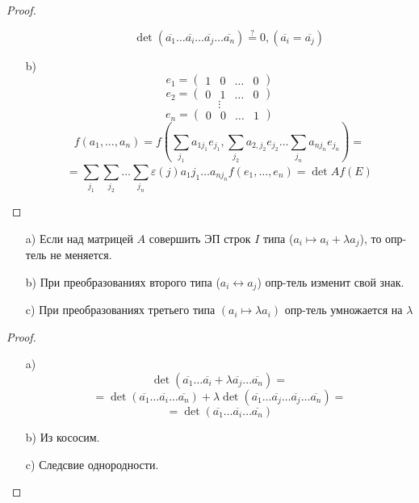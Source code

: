 \begin{theorem}
\begin{proof}
\begin{itemize}
\begin{itemize}
     \[
     \det (\overline{a_1} \ldots \overline{a_i} \ldots \overline{a_j} \ldots \overline{a_n}) \overset{?}{=} 0, (\overline{a_i} = \overline{a_j})
     \]
      \end{itemize}
    \item [b) ] \[
        e_1 = \begin{pmatrix}1 & 0 & \ldots & 0 \end{pmatrix}
    \]
    \[
      e_2 = \begin{pmatrix}0 & 1 & \ldots & 0 \end{pmatrix}
    \]
    \[
      \vdots
    \]
    \[
      e_n = \begin{pmatrix}0 & 0 & \ldots & 1 \end{pmatrix}
    \]
      \[
    f(a_1, \ldots, a_n) = f\left(\sum_{j_1}^{} a_{1 j_1}e_{j_1}, \sum_{j_2}^{} a_{2, j_2} e_{j_2} \ldots \sum_{j_n}^{} a_{n j_n} e_{j_n}\right) = 
    \]
    \[
     = \sum_{j_1}^{} \sum_{j_2}^{} \ldots \sum_{j_n}^{} \varepsilon(j) a_1 {j_1} \ldots a_{n j_n} f(e_1, \ldots, e_n) = \det A f(E)
    \]
  \end{itemize}
\end{proof}
\end{theorem}
\begin{statement}
\begin{itemize}
  \item [a) ] Если над матрицей $A$ совершить ЭП строк $I$ типа ($a_i \mapsto a_i + \lambda a_j$), то опр-тель не меняется.
  \item [b) ] При преобразованиях второго типа ($a_i \leftrightarrow a_j$) опр-тель изменит свой знак.
  \item [c) ] При преобразованиях третьего типа $(a_i \mapsto \lambda a_i)$ опр-тель умножается на $\lambda$
\end{itemize}
\end{statement}
\begin{proof}
\begin{itemize}
  \item [a) ] \[
      \det (\overline{a_1} \ldots \overline{a_i} + \lambda\overline{a_j} \ldots \overline{a_n}) = 
  \]
  \[
   = \det(\overline{a_1} \ldots \overline{a_i} \ldots \overline{a_n}) + \lambda\det (\overline{a_1} \ldots \overline{a_j} \ldots \overline{a_j} \ldots \overline{a_n}) = 
  \]
  \[
   = \det(\overline{a_1} \ldots \overline{a_i} \ldots \overline{a_n})
  \]
\item [b)] Из кососим.
\item [c) ] Следсвие однородности.
\end{itemize}
\end{proof}
